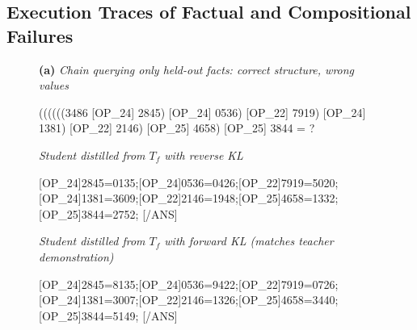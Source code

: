 \documentclass[]{template}
\theoremstyle{plain}
\theoremstyle{definition}
\theoremstyle{remark}
\begin{document}
\subsection{Execution Traces of Factual and Compositional Failures}
\label{sec:trace_analysis}

\begin{figure}[t]
\centering
\begin{tcolorbox}[colback=lightgray!12,colframe=Black,boxrule=0.4pt,left=8pt,right=8pt,top=8pt,bottom=8pt]
\footnotesize
\textbf{(a)} \textit{Chain querying only held-out facts: correct structure, wrong values}\par\smallskip
{\ttfamily\noindent
((((((3486 [OP\_24] 2845) [OP\_24] 0536) [OP\_22] 7919) [OP\_24] 1381)\newline
\hspace*{1em}[OP\_22] 2146) [OP\_25] 4658) [OP\_25] 3844 = ?\par}
\smallskip
\textit{Student distilled from $T_f$ with reverse KL}\par\smallskip
{\ttfamily{}[OP\_24]2845={\color{red}0135};[OP\_24]0536={\color{red}0426};[OP\_22]7919={\color{red}5020};\;[OP\_24]1381={\color{red}3609};[OP\_22]2146={\color{red}1948};[OP\_25]4658={\color{red}1332};\;[OP\_25]3844={\color{red}2752}; [/ANS]\par}
\smallskip
\textit{Student distilled from $T_f$ with forward KL (matches teacher demonstration)}\par\smallskip
{\ttfamily{}[OP\_24]2845=8135;[OP\_24]0536=9422;[OP\_22]7919=0726;\;[OP\_24]1381=3007;[OP\_22]2146=1326;[OP\_25]4658=3440;\;[OP\_25]3844=5149; [/ANS]\par}
\end{tcolorbox}


\end{figure}
\end{document}
